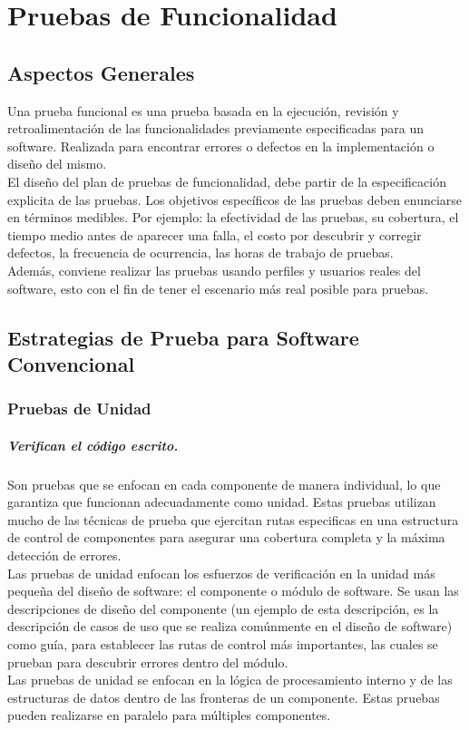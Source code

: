 \newpage
\chapter{Pruebas de Funcionalidad}
\section{Aspectos Generales}
Una prueba funcional es una prueba basada en la ejecución, revisión y retroalimentación de las funcionalidades previamente especificadas para un software. Realizada para encontrar errores o defectos en la implementación o diseño del mismo.\\
El diseño del plan de pruebas de funcionalidad, debe partir de la especificación explicita de las pruebas. Los objetivos específicos de las pruebas deben enunciarse en términos medibles. Por ejemplo: la efectividad de las pruebas, su cobertura, el tiempo medio antes de aparecer una falla, el costo por descubrir y corregir defectos, la frecuencia de ocurrencia, las horas de trabajo de pruebas.\\Además, conviene realizar las pruebas usando perfiles y usuarios reales del software, esto con el fin de tener el escenario más real posible para pruebas.
\section{Estrategias de Prueba para Software Convencional}
\subsection{Pruebas de Unidad}
\paragraph{Verifican el código escrito.} 
Son pruebas que se enfocan en cada componente de manera individual, lo que garantiza que funcionan adecuadamente como unidad. Estas pruebas utilizan mucho de las técnicas de prueba que ejercitan rutas especificas en una estructura de control de componentes para asegurar una cobertura completa y la máxima detección de errores.\\
Las pruebas de unidad enfocan los esfuerzos de verificación en la unidad más pequeña del diseño de software: el componente o módulo de software. Se usan las descripciones de diseño del componente (un ejemplo de esta descripción, es la descripción de casos de uso que se realiza comúnmente en el diseño de software) como guía, para establecer las rutas de control más importantes, las cuales se prueban para descubrir errores dentro del módulo.\\ Las pruebas de unidad se enfocan en la lógica de procesamiento interno y de las estructuras de datos dentro de las fronteras de un componente. Estas pruebas pueden realizarse en paralelo para múltiples componentes.\\
